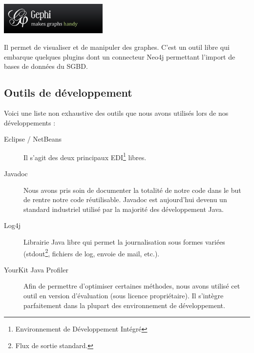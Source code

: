 \begin{center}
\includegraphics[width=0.4\textwidth]{files/outils/gephi}
\end{center}

Il permet de visualiser et de manipuler des graphes. C'est un outil libre qui embarque quelques plugins dont un connecteur Neo4j permettant l'import de bases de données du SGBD.

\subsection{Outils de développement}
Voici une liste non exhaustive des outils que nous avons utilisés lors de nos développements :
\begin{description}
\item[Eclipse / NetBeans] Il s'agit des deux principaux EDI\footnote{Environnement de Développement Intégré} libres.
\item[Javadoc] Nous avons pris soin de documenter la totalité de notre code dans le but de rentre notre code réutilisable. Javadoc est aujourd'hui devenu un standard industriel utilisé par la majorité des développement Java.
\item[Log4j] Librairie Java libre qui permet la journalisation sous formes variées (stdout\footnote{Flux de sortie standard.}, fichiers de log, envoie de mail, etc.).
\item[YourKit Java Profiler] Afin de permettre d'optimiser certaines méthodes, nous avons utilisé cet outil en version d'évaluation (sous licence propriétaire). Il s'intègre parfaitement dans la plupart des environnement de développement.
\end{description}